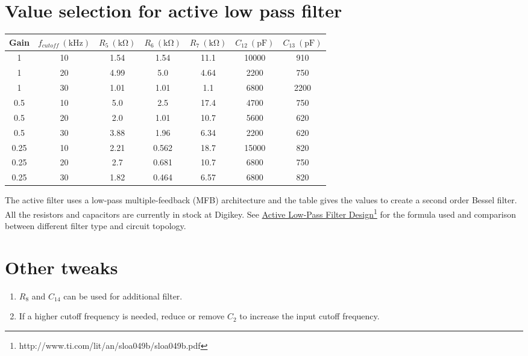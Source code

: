 \documentclass[10pt,fleqn]{article}
\begin{document}
\section{Value selection for active low pass filter}
\begin{tabular}{|c|c|c|c|c|c|c|}
  \hline
  Gain&$f_{cutoff}\ (\mathrm{kHz})$&$R_5\ (\mathrm{k\Omega})$&$R_6\ (\mathrm{k\Omega})$&$R_7\ (\mathrm{k\Omega})$&$C_{12}\ (\mathrm{pF})$&$C_{13}\ (\mathrm{pF})$\\\hline
  1&10&1.54&1.54&11.1&10000&910\\\hline
  1&20&4.99&5.0&4.64&2200&750\\\hline
  1&30&1.01&1.01&1.1&6800&2200\\\hline
  0.5&10&5.0&2.5&17.4&4700&750\\\hline
  0.5&20&2.0&1.01&10.7&5600&620\\\hline
  0.5&30&3.88&1.96&6.34&2200&620\\\hline
  0.25&10&2.21&0.562&18.7&15000&820\\\hline
  0.25&20&2.7&0.681&10.7&6800&750\\\hline
  0.25&30&1.82&0.464&6.57&6800&820\\\hline
\end{tabular}
The active filter uses a low-pass multiple-feedback (MFB) architecture
and the table gives the values to create a second order Bessel filter.
All the resistors and capacitors are currently in stock at Digikey.
See \href{http://www.ti.com/lit/an/sloa049b/sloa049b.pdf}
{Active Low-Pass Filter Design}\footnote{http://www.ti.com/lit/an/sloa049b/sloa049b.pdf}
for the formula used and comparison between different filter type and circuit topology.

\section{Other tweaks}
\begin{enumerate}
\item $R_8$ and $C_{14}$ can be used for additional filter.
\item If a higher cutoff frequency is needed, reduce or remove $C_2$ to increase the
  input cutoff frequency.
\end{enumerate}
\end{document}
